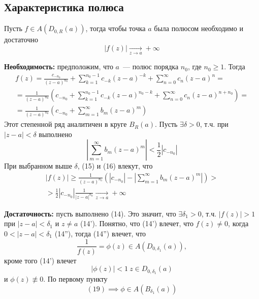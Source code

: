 \documentclass[main]{subfiles}
\begin{document}
\subsection{Характеристика полюса}
\begin{theorem}
    Пусть $f \in A(D_{0, R} (a))$, тогда чтобы точка $a$ была полюсом необходимо и достаточно
    \[|f(z)| \xrightarrow[z \to a]{} + \infty \tag{14}\]
\end{theorem}
\begin{longProof}
    \textbf{Необходимость:} предположим, что $a$~--- полюс порядка $n_0$, где $n_0 \ge 1$.
    Тогда
    \begin{multline*}
        f(z) = \frac{c_{-n_0}}{(z-a)^{n_0}} + \sum_{k=1}^{n_0 - 1} c_{-k} (z-a)^{-k} + \sum_{n=0}^{\infty} c_{n} (z-a)^n = \\
        = \frac{1}{(z-a)^{n_0}}\left( c_{-n_0} + \sum_{k=1}^{n_0 -1} c_{-k}(z-a)^{n_0 - k} + \sum_{n=0}^{\infty} c_n (z-a)^{n+n_0}\right) = \\
        = \frac{1}{(z-a)^{n_0}}\left( c_{-n_0} + \sum_{m=1}^{\infty} b_m(z-a)^{m}\right) \tag{15}
    \end{multline*}
    Этот степенной ряд аналитичен в круге $B_R(a)$.
    Пусть $\exists \delta > 0$, т.ч. при $|z-a| < \delta$ выполнено
    \[\left| \sum_{m=1}^{\infty} b_m(z-a)^{m} \right| < \frac{1}{2} \left|c_{-n_0}\right| \tag{16}\]
    При выбранном выше $\delta$, (15) и (16) влекут, что
    \begin{multline*}
        |f(z)| \ge \frac{1}{(z-a)^{n_0}} \left( \left|c_{-n_0}\right| - \left| \sum_{m=1}^{\infty} b_m(z-a)^{m} \right|\right) > \\
        > \frac{1}{2} \left|c_{-n_0}\right| \frac{1}{|z-a|^{n_0}} \xrightarrow[z \to a]{} +\infty
    \end{multline*}

    \textbf{Достаточность:} пусть выполнено (14).
    Это значит, что $\exists \delta_1 > 0$, т.ч. $|f(z)| > 1$ при $|z - a| < \delta_1$ и $z \neq a$ (14').
    Понятно, что (14') влечет, что $f(z) \neq 0$, когда $0 < |z - a| < \delta_1$ (14''), тогда (14'') влечет, что
    \[\frac{1}{f(z)} = \phi(z) \in A(D_{0, \delta_1}(a)) \tag{18},\]
    кроме того (14') влечет
    \[|\phi(z)| < 1\ z \in D_{0, \delta_1}(a) \tag{19}\]
    и $\phi(z) \not\equiv 0$.
    По первому пункту
    \[(19) \implies \phi \in A(B_{\delta_1}(a)) \tag{2}\]


\end{longProof}
\end{document}
